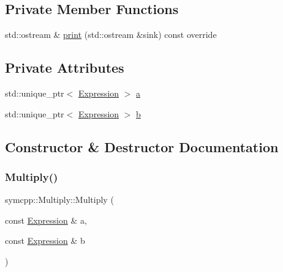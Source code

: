 \subsection*{Private Member Functions}
\begin{DoxyCompactItemize}
\item 
std\+::ostream \& \mbox{\hyperlink{classsymcpp_1_1Multiply_a8d6dbfc85d0609f40d52c0fc853a06b5}{print}} (std\+::ostream \&sink) const override
\end{DoxyCompactItemize}
\subsection*{Private Attributes}
\begin{DoxyCompactItemize}
\item 
std\+::unique\+\_\+ptr$<$ \mbox{\hyperlink{classsymcpp_1_1Expression}{Expression}} $>$ \mbox{\hyperlink{classsymcpp_1_1Multiply_a8ed32ccb235cea51161dd0fd25ea130d}{a}}
\item 
std\+::unique\+\_\+ptr$<$ \mbox{\hyperlink{classsymcpp_1_1Expression}{Expression}} $>$ \mbox{\hyperlink{classsymcpp_1_1Multiply_a3d7a1b6e6e35585098b25f8b3a59e6ae}{b}}
\end{DoxyCompactItemize}


\subsection{Constructor \& Destructor Documentation}
\mbox{\label{classsymcpp_1_1Multiply_abe8b88c2ac3ecd7deb275b1cb1f5dd9d}} 
\subsubsection{\texorpdfstring{Multiply()}{Multiply()}\hspace{0.1cm}{\footnotesize\ttfamily [1/2]}}
{\footnotesize\ttfamily symcpp\+::\+Multiply\+::\+Multiply (\begin{DoxyParamCaption}\item[{const \mbox{\hyperlink{classsymcpp_1_1Expression}{Expression}} \&}]{a,  }\item[{const \mbox{\hyperlink{classsymcpp_1_1Expression}{Expression}} \&}]{b }\end{DoxyParamCaption})}

\mbox{\label{classsymcpp_1_1Multiply_abefbdc2703e4c56207fe9aa987097fe6}} 
